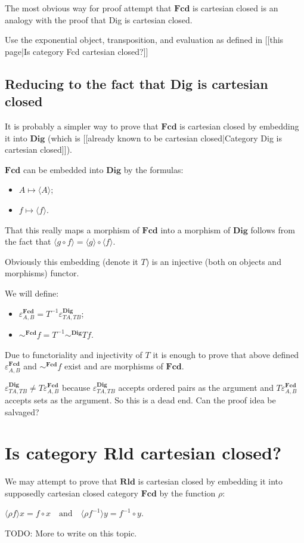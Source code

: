The most obvious way for proof attempt that $\mathbf{Fcd}$ is cartesian closed is an analogy with the proof that Dig is cartesian closed.

Use the exponential object, transposition, and evaluation as defined in [[this page|Is category Fcd cartesian closed?]]

\subsection{Reducing to the fact that Dig is cartesian closed}
It is probably a simpler way to prove that $\mathbf{Fcd}$ is cartesian closed by embedding it into $\mathbf{Dig}$ (which is [[already known to be cartesian closed|Category Dig is cartesian closed]]).

$\mathbf{Fcd}$ can be embedded into $\mathbf{Dig}$ by the formulas:
\begin{itemize}
\item $A \mapsto \langle A \rangle$;
\item $f \mapsto \langle f \rangle$.
\end{itemize}

That this really maps a morphism of $\mathbf{Fcd}$ into a morphism of $\mathbf{Dig}$ follows from the fact that $\langle g\circ f\rangle = \langle g\rangle\circ\langle f\rangle$.

Obviously this embedding (denote it $T$) is an injective (both on objects and morphisms) functor.

We will define:
\begin{itemize}
\item $\varepsilon^{\mathbf{Fcd}}_{A, B} = T^{-1} \varepsilon^{\mathbf{Dig}}_{T A, T B}$;
\item $\sim^{\mathbf{Fcd}} f = T^{-1} \sim^{\mathbf{Dig}} T f$.
\end{itemize}

Due to functoriality and injectivity of $T$ it is enough to prove that above defined $\varepsilon^{\mathbf{Fcd}}_{A, B}$ and $\sim^{\mathbf{Fcd}} f$ exist and are morphisms of $\mathbf{Fcd}$.

$\varepsilon^{\mathbf{Dig}}_{T A, T B} \ne T\varepsilon^{\mathbf{Fcd}}_{A, B}$ because $\varepsilon^{\mathbf{Dig}}_{T A, T B}$ accepts ordered pairs as the argument and $T \varepsilon^{\mathbf{Fcd}}_{A, B}$ accepts sets as the argument. So this is a dead end. Can the proof idea be salvaged?

\section{Is category Rld cartesian closed?}

We may attempt to prove that $\mathbf{Rld}$ is cartesian closed by embedding it into supposedly cartesian closed category $\mathbf{Fcd}$ by the function $\rho$:

$\langle \rho f \rangle x = f \circ x \quad \text{and} \quad \langle \rho f^{- 1} \rangle y = f^{- 1} \circ y$.

TODO: More to write on this topic.
